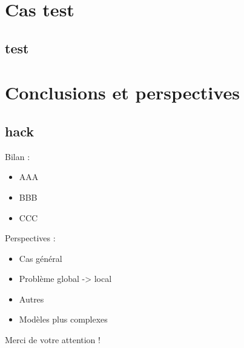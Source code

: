 \documentclass[compress, blue, hyperref={unicode, bookmarks=true, pdfpagemode=FullScreen}]{beamer}
\begin{document}
\section[Cas test]{Cas test}\subsection{test}



\section{Conclusions et perspectives}\subsection{hack}
\begin{frame}
Bilan :
\begin{itemize}
\item AAA
\item BBB
\item CCC
\end{itemize}
\vspace{1cm}
\pause
Perspectives :
\begin{itemize}
\item Cas g\'en\'eral
\item Probl\`eme global -> local
\item Autres 
\item Modèles plus complexes
\end{itemize}
\end{frame}


\begin{frame}
\begin{center}
\Huge Merci de votre attention !
\end{center}
\end{frame}


\tiny

\end{document}
